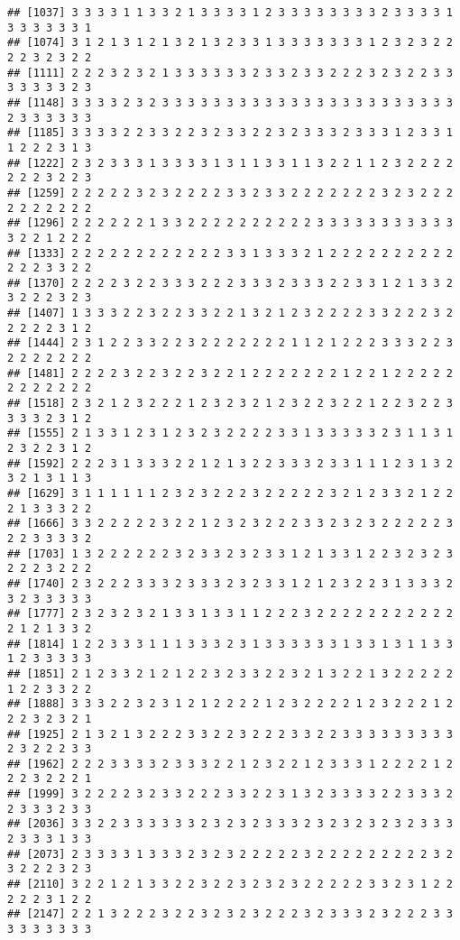 \documentclass[
]{article}
\begin{document}
\begin{verbatim}
## [1037] 3 3 3 3 1 1 3 3 2 1 3 3 3 3 1 2 3 3 3 3 3 3 3 3 2 3 3 3 3 1 3 3 3 3 3 3 1
## [1074] 3 1 2 1 3 1 2 1 3 2 1 3 2 3 3 1 3 3 3 3 3 3 3 1 2 3 2 3 2 2 2 2 3 2 3 2 2
## [1111] 2 2 2 3 2 3 2 1 3 3 3 3 3 3 2 3 3 2 3 3 2 2 2 3 2 3 2 2 3 3 3 3 3 3 3 2 3
## [1148] 3 3 3 3 2 3 2 3 3 3 3 3 3 3 3 3 3 3 3 3 3 3 3 3 3 3 3 3 3 3 2 3 3 3 3 3 3
## [1185] 3 3 3 3 2 2 3 3 2 2 3 2 3 3 2 2 3 2 3 3 3 2 3 3 3 1 2 3 3 1 1 2 2 2 3 1 3
## [1222] 2 3 2 3 3 3 1 3 3 3 3 1 3 1 1 3 3 1 1 3 2 2 1 1 2 3 2 2 2 2 2 2 2 3 2 2 3
## [1259] 2 2 2 2 2 3 2 3 2 2 2 2 3 3 2 3 3 2 2 2 2 2 2 2 3 2 3 2 2 2 2 2 2 2 2 2 2
## [1296] 2 2 2 2 2 2 1 3 3 2 2 2 2 2 2 2 2 2 2 3 3 3 3 3 3 3 3 3 3 3 3 2 2 1 2 2 2
## [1333] 2 2 2 2 2 2 2 2 2 2 2 2 3 3 1 3 3 3 2 1 2 2 2 2 2 2 2 2 2 2 2 2 2 3 3 2 2
## [1370] 2 2 2 2 3 2 2 3 3 3 2 2 2 3 3 3 2 3 3 3 2 2 3 3 1 2 1 3 3 2 3 2 2 2 3 2 3
## [1407] 1 3 3 3 2 2 3 2 2 3 3 2 2 1 3 2 1 2 3 2 2 2 2 3 3 2 2 2 3 2 2 2 2 2 3 1 2
## [1444] 2 3 1 2 2 3 3 2 2 3 2 2 2 2 2 2 2 1 1 2 1 2 2 2 3 3 3 2 2 3 2 2 2 2 2 2 2
## [1481] 2 2 2 2 3 2 2 3 2 2 3 2 2 1 2 2 2 2 2 2 2 1 2 2 1 2 2 2 2 2 2 2 2 2 2 2 2
## [1518] 2 3 2 1 2 3 2 2 2 1 2 3 2 3 2 1 2 3 2 2 3 2 2 1 2 2 3 2 2 3 3 3 3 2 3 1 2
## [1555] 2 1 3 3 1 2 3 1 2 3 2 3 2 2 2 2 3 3 1 3 3 3 3 3 2 3 1 1 3 1 2 3 2 2 3 1 2
## [1592] 2 2 2 3 1 3 3 3 2 2 1 2 1 3 2 2 3 3 3 2 3 3 1 1 1 2 3 1 3 2 3 2 1 3 1 1 3
## [1629] 3 1 1 1 1 1 1 2 3 2 3 2 2 2 3 2 2 2 2 2 3 2 1 2 3 3 2 1 2 2 2 1 3 3 3 2 2
## [1666] 3 3 2 2 2 2 2 3 2 2 1 2 3 2 3 2 2 2 3 3 2 3 2 3 2 2 2 2 2 3 2 2 3 3 3 3 2
## [1703] 1 3 2 2 2 2 2 2 3 2 3 3 2 3 2 3 3 1 2 1 3 3 1 2 2 3 2 3 2 3 2 2 2 3 2 2 2
## [1740] 2 3 2 2 2 3 3 3 2 3 3 3 2 3 2 3 3 1 2 1 2 3 2 2 3 1 3 3 3 2 3 2 3 3 3 3 3
## [1777] 2 3 2 3 2 3 2 1 3 3 1 3 3 1 1 2 2 2 3 2 2 2 2 2 2 2 2 2 2 2 2 1 2 1 3 3 2
## [1814] 1 2 2 3 3 3 1 1 1 3 3 3 2 3 1 3 3 3 3 3 3 1 3 3 1 3 1 1 3 3 1 2 3 3 3 3 3
## [1851] 2 1 2 3 3 2 1 2 1 2 2 3 2 3 3 2 2 3 2 1 3 2 2 1 3 2 2 2 2 2 1 2 2 3 3 2 2
## [1888] 3 3 3 2 2 3 2 3 1 2 1 2 2 2 2 1 2 3 2 2 2 2 1 2 3 2 2 2 1 2 2 2 3 2 3 2 1
## [1925] 2 1 3 2 1 3 2 2 2 3 3 2 2 3 2 2 2 3 3 2 2 3 3 3 3 3 3 3 3 3 2 3 2 2 2 3 3
## [1962] 2 2 2 3 3 3 3 2 3 3 3 2 2 1 2 3 2 2 1 2 3 3 3 1 2 2 2 2 1 2 2 2 3 2 2 2 1
## [1999] 3 2 2 2 2 3 2 3 3 2 2 2 3 3 2 2 3 1 3 2 3 3 3 3 2 2 3 3 3 2 2 3 3 3 2 3 3
## [2036] 3 3 2 2 3 3 3 3 3 3 2 3 2 3 2 3 3 3 2 3 2 3 2 3 2 3 2 3 3 3 2 3 3 3 1 3 3
## [2073] 2 3 3 3 3 1 3 3 3 2 3 2 3 2 2 2 2 2 3 2 2 2 2 2 2 2 2 2 3 2 3 2 2 2 3 2 3
## [2110] 3 2 2 1 2 1 3 3 2 2 3 2 2 3 2 3 2 3 2 2 2 2 2 3 3 2 3 1 2 2 2 2 2 3 1 2 2
## [2147] 2 2 1 3 2 2 2 3 2 2 3 2 3 2 3 2 2 2 3 2 3 3 3 2 3 2 2 2 3 3 3 3 3 3 3 3 3

\end{verbatim}
\end{document}
